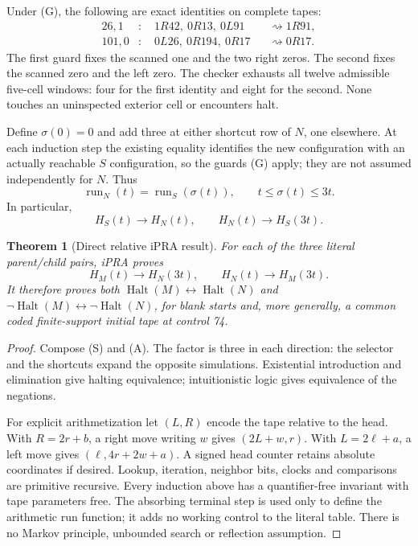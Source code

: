 \documentclass[11pt,letterpaper]{article}
\newtheorem{theorem}{Theorem}
\newcommand{\Halt}{\operatorname{Halt}}
\begin{document}
Under (G), the following are exact identities on complete tapes:
\begin{align*}
26,1 &: \quad 1R42,\ 0R13,\ 0L91
                 &&\rightsquigarrow 1R91,\\
101,0 &: \quad 0L26,\ 0R194,\ 0R17
                 &&\rightsquigarrow 0R17.
\end{align*}
The first guard fixes the scanned one and the two right zeros. The second
fixes the scanned zero and the left zero. The checker exhausts all twelve
admissible five-cell windows: four for the first identity and eight for
the second. None touches an uninspected exterior cell or encounters halt.

Define $\sigma(0)=0$ and add three at either shortcut row of $N$, one
elsewhere. At each induction step the existing equality identifies the
new configuration with an actually reachable $S$ configuration, so the
guards (G) apply; they are not assumed independently for $N$. Thus
\[
 \operatorname{run}_N(t)=\operatorname{run}_S(\sigma(t)),\qquad
 t\le\sigma(t)\le3t.
\]
In particular,
\[
 H_S(t)\to H_N(t),\qquad H_N(t)\to H_S(3t).       \tag{A}
\]

\begin{theorem}[Direct relative iPRA result]
For each of the three literal parent/child pairs, iPRA proves
\[
 \boxed{H_M(t)\to H_N(3t),\qquad H_N(t)\to H_M(3t).}
\]
It therefore proves both $\Halt(M)\leftrightarrow\Halt(N)$ and
$\neg\Halt(M)\leftrightarrow\neg\Halt(N)$, for blank starts and,
more generally, a common coded finite-support initial tape at control 74.
\end{theorem}
\begin{proof}
Compose (S) and (A). The factor is three in each direction: the selector
and the shortcuts expand the opposite simulations. Existential
introduction and elimination give halting equivalence; intuitionistic
logic gives equivalence of the negations.

For explicit arithmetization let $(L,R)$ encode the tape relative to the
head. With $R=2r+b$, a right move writing $w$ gives $(2L+w,r)$.
With $L=2\ell+a$, a left move gives $(\ell,4r+2w+a)$. A signed head
counter retains absolute coordinates if desired. Lookup, iteration,
neighbor bits, clocks and comparisons are primitive recursive. Every
induction above has a quantifier-free invariant with tape parameters free.
The absorbing terminal step is used only to define the arithmetic run
function; it adds no working control to the literal table. There is no
Markov principle, unbounded search or reflection assumption.
\end{proof}
\end{document}
